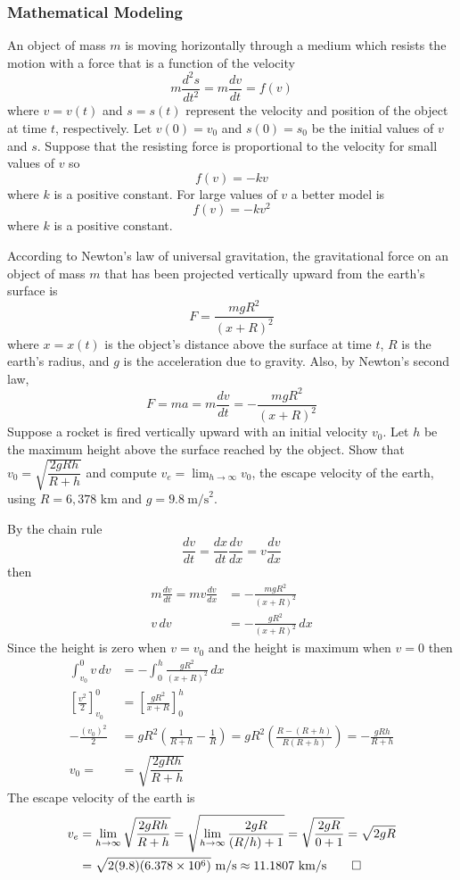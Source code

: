 \subsubsection{Mathematical Modeling}
An object of mass \(m\) is moving horizontally through a medium which resists the
motion with a force that is a function of the velocity
\[m\frac{d^2s}{dt^2}=m\frac{dv}{dt}=f(v)\]
where \(v=v(t)\) and \(s=s(t)\) represent the velocity and position of the
object at time \(t\), respectively.
Let \(v(0)=v_0\) and \(s(0)=s_0\) be the initial values of \(v\) and \(s\).
Suppose that the resisting force is proportional to the velocity for small
values of \(v\) so
\[f(v)=-kv\]
where \(k\) is a positive constant.
For large values of \(v\) a better model is
\[f(v)=-kv^2\]
where \(k\) is a positive constant.
\begin{problem}
    According to Newton's law of universal gravitation,
    the gravitational force on an object of mass \(m\) that has been
    projected vertically upward from the earth's surface is
    \[F=\frac{mgR^2}{(x+R)^2}\]
    where \(x=x(t)\) is the object's distance
    above the surface at time \(t\), \(R\) is the
    earth's radius, and \(g\) is the acceleration due to gravity.
    Also, by Newton's second law,
    \[F=ma=m\frac{dv}{dt}=-\frac{mgR^2}{(x+R)^2}\]
    Suppose a rocket is fired vertically upward with an initial velocity \(v_0\).
    Let \(h\) be the maximum height above the surface reached by the object.
    Show that \(v_0=\sqrt{\dfrac{2gRh}{R+h}}\) and compute
    \(v_e=\lim_{h\to\infty}v_0\), the escape velocity of the earth, using
    \(R=6,378\) km and \(g=9.8\ \text{m/s}^2\).
\end{problem}
\begin{solution}
    By the chain rule
    \[\frac{dv}{dt}=\frac{dx}{dt}\frac{dv}{dx}=v\frac{dv}{dx}\]
    then
    \begin{align*}
        m\frac{dv}{dt}=mv\frac{dv}{dx} &= -\frac{mgR^2}{(x+R)^2} \\
        v\,dv &= -\frac{gR^2}{(x+R)^2}\,dx
    \end{align*}
    Since the height is zero when \(v=v_0\) and the height is maximum when
    \(v=0\) then
    \begin{align*}
        \int_{v_0}^0 v\,dv &= -\int_0^h \frac{gR^2}{(x+R)^2}\,dx \\
        \left[\frac{v^2}{2}\right]_{v_0}^0
        &= \left[\frac{gR^2}{x+R}\right]_0^h \\
        -\frac{(v_0)^2}{2} &= gR^2\left(\frac{1}{R+h}-\frac{1}{R}\right)
        =gR^2\left(\frac{R-(R+h)}{R(R+h)}\right)=-\frac{gRh}{R+h} \\
        v_0= &= \sqrt{\dfrac{2gRh}{R+h}}
    \end{align*}
    The escape velocity of the earth is
    \begin{align*}
        v_e &= \lim_{h\to\infty}\sqrt{\dfrac{2gRh}{R+h}}
        =\sqrt{\lim_{h\to\infty}\frac{2gR}{(R/h)+1}}=\sqrt{\frac{2gR}{0+1}}
        =\sqrt{2gR} \\
        &=\sqrt{2(9.8)(6.378\times10^6)}\ \text{m/s}
        \approx 11.1807\ \text{km/s} \qedhere
    \end{align*}
\end{solution}